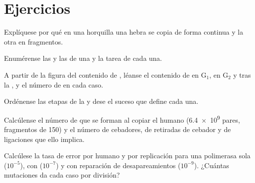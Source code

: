 \section{Ejercicios}

\begin{exercise}[$\star$]\label{exo:b1:replication-mitosis:1}
Explíquese por qué en una horquilla una hebra se copia de forma continua y
la otra en fragmentos.
\end{exercise}

\begin{exercise}[$\star$]\label{exo:b1:replication-mitosis:2}
Enumérense las  y las  de una  y la
tarea de cada una.
\end{exercise}

\begin{exercise}[$\star$]\label{exo:b1:replication-mitosis:3}
A partir de la figura del contenido de , léanse el contenido de  en
G$_1$, en G$_2$ y tras la , y el número de  en cada caso.
\end{exercise}

\begin{exercise}[$\star$]\label{exo:b1:replication-mitosis:4}
Ordénense las etapas de la  y dese el suceso que define cada una.
\end{exercise}

\begin{exercise}[$\star\star$]\label{exo:b1:replication-mitosis:5}
Calcúlense el número de  que se forman al copiar el
 humano (\num{6.4e9} pares, fragmentos de \qty{150}{}) y el número de
cebadores, de retiradas de cebador y de ligaciones que ello implica.
\end{exercise}

\begin{exercise}[$\star\star$]\label{exo:b1:replication-mitosis:6}
Calcúlese la tasa de error por  humano y por replicación para una
polimerasa sola ($10^{-5}$), con  ($10^{-7}$) y con
reparación de desapareamientos ($10^{-9}$). ¿Cuántas mutaciones da cada caso
por división?
\end{exercise}

